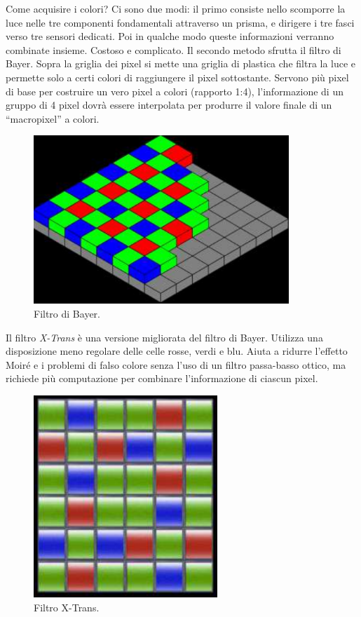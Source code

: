 \documentclass[a4paper,11pt]{article}
\begin{document}
Come acquisire i colori? Ci sono due modi: il primo consiste nello scomporre la luce nelle tre componenti
fondamentali attraverso un prisma, e dirigere i tre fasci verso tre sensori dedicati. Poi in qualche modo queste informazioni
verranno combinate insieme. Costoso e complicato.
\newline
Il secondo metodo sfrutta il filtro di Bayer. Sopra la griglia dei pixel si mette una griglia di plastica che filtra la luce e permette solo a certi colori di
raggiungere il pixel sottostante. Servono più pixel di base per costruire un vero pixel a colori (rapporto 1:4), l'informazione di un gruppo di 4 pixel dovrà essere interpolata
per produrre il valore finale di un ``macropixel'' a colori.

\renewcommand{\thefigure}{3.7}
\begin{figure}[!h]
  \centering
    \includegraphics[scale=0.5]{images/3/bayer.png}
    \caption{Filtro di Bayer.}
\end{figure}

Il filtro \textit{X-Trans} è una versione migliorata del filtro di Bayer. Utilizza una disposizione meno regolare delle celle rosse, verdi e blu. Aiuta a ridurre
l'effetto Moiré e i problemi di falso colore senza l'uso di un filtro passa-basso ottico, ma richiede più computazione per combinare l'informazione di ciascun pixel.

\renewcommand{\thefigure}{3.8}
\begin{figure}[!h]
  \centering
    \includegraphics[scale=0.5]{images/3/xtrans.png}
    \caption{Filtro X-Trans.}
\end{figure}
\end{document}
